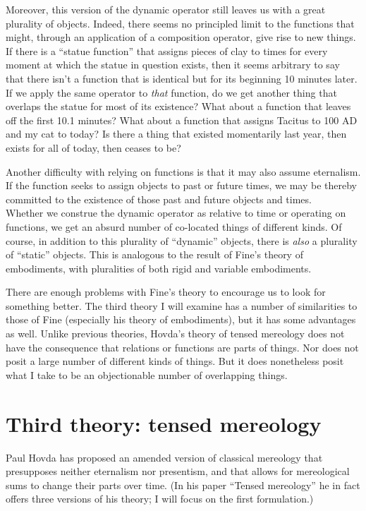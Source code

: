 \documentclass[12pt,twoside]{reedfancy}
\begin{document}
\begin{spacing}{1.25}
Moreover, this version of the dynamic operator still leaves us with a
great plurality of objects.  Indeed, there seems no principled limit
to the functions that might, through an application of a composition
operator, give rise to new things.  If there is a ``statue function''
that assigns pieces of clay to times for every moment at which the
statue in question exists, then it seems arbitrary to say that there
isn't a function that is identical but for its beginning 10 minutes
later.  If we apply the same operator to {\em that} function, do we
get another thing that overlaps the statue for most of its existence?
What about a function that leaves off the first 10.1 minutes?  What
about a function that assigns Tacitus to 100 AD and my cat to today?
Is there a thing that existed momentarily last year, then exists for
all of today, then ceases to be?

Another difficulty with relying on functions is that it may also
assume eternalism.  If the function seeks to assign objects to past or
future times, we may be thereby committed to the existence of those
past and future objects and times.\\

Whether we construe the dynamic operator as relative to time or
operating on functions, we get an absurd number of co-located things
of different kinds.  Of course, in addition to this plurality of
``dynamic'' objects, there is {\em also} a plurality of ``static''
objects.  This is analogous to the result of Fine's theory of
embodiments, with pluralities of both rigid and variable embodiments.

There are enough problems with Fine's theory to encourage us to look
for something better.  The third theory I will examine has a number of
similarities to those of Fine (especially his theory of embodiments),
but it has some advantages as well.  Unlike previous theories, Hovda's
theory of tensed mereology does not have the consequence that
relations or functions are parts of things.  Nor does not posit a
large number of different kinds of things.  But it does nonetheless
posit what I take to be an objectionable number of overlapping things.

\section{Third theory: tensed mereology}
\label{hovda}
Paul Hovda has proposed an amended version of classical mereology that
presupposes neither eternalism nor presentism, and that allows for
mereological sums to change their parts over time.  (In his paper
``Tensed mereology'' \citeyearpar{hovda2011} he in fact offers three
versions of his theory; I will focus on the first formulation.)


\end{spacing}
\end{document}
